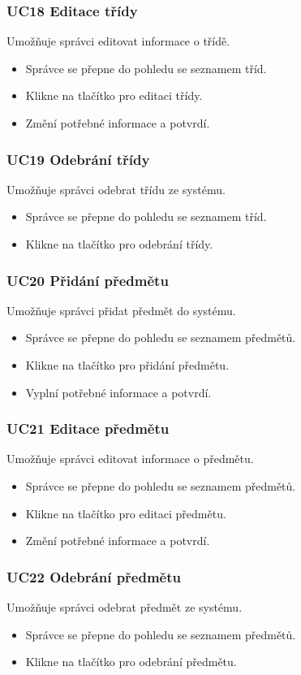 \subsubsection*{UC18 Editace třídy}
Umožňuje správci editovat informace o třídě.
\begin{itemize}
    \item Správce se přepne do pohledu se seznamem tříd.
    \item Klikne na tlačítko pro editaci třídy.
    \item Změní potřebné informace a potvrdí.
\end{itemize}

\subsubsection*{UC19 Odebrání třídy}
Umožňuje správci odebrat třídu ze systému. 
\begin{itemize}
    \item Správce se přepne do pohledu se seznamem tříd.
    \item Klikne na tlačítko pro odebrání třídy.
\end{itemize}

\subsubsection*{UC20 Přidání předmětu}
Umožňuje správci přidat předmět do systému. 
\begin{itemize}
    \item Správce se přepne do pohledu se seznamem předmětů.
    \item Klikne na tlačítko pro přidání předmětu.
    \item Vyplní potřebné informace a potvrdí.
\end{itemize}

\subsubsection*{UC21 Editace předmětu}
Umožňuje správci editovat informace o předmětu.
\begin{itemize}
    \item Správce se přepne do pohledu se seznamem předmětů.
    \item Klikne na tlačítko pro editaci předmětu.
    \item Změní potřebné informace a potvrdí.
\end{itemize}

\subsubsection*{UC22 Odebrání předmětu}
Umožňuje správci odebrat předmět ze systému. 
\begin{itemize}
    \item Správce se přepne do pohledu se seznamem předmětů.
    \item Klikne na tlačítko pro odebrání předmětu.
\end{itemize}

